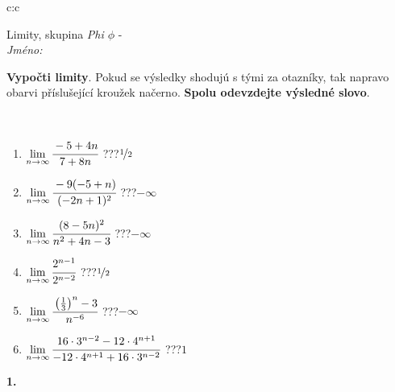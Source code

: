 \documentclass[10pt]{report}
\begin{document}
\begin{tabular}{c:c}
\begin{minipage}[c][104.5mm][t]{0.5\linewidth}
\begin{center}
\vspace{7mm}
{\huge Limity, skupina \textit{Phi $\phi$} -}\\[5mm]
\textit{Jméno:}\phantom{xxxxxxxxxxxxxxxxxxxxxxxxxxxxxxxxxxxxxxxxxxxxxxxxxxxxxxxxxxxxxxxxx}\\[5mm]
\begin{minipage}{0.95\linewidth}
\begin{center}
\textbf{Vypočti limity}. Pokud se výsledky shodujú s tými za otazníky, tak napravo\\obarvi příslušející kroužek načerno. \textbf{Spolu odevzdejte výsledné slovo}.
\end{center}
\end{minipage}
\\[1mm]
\begin{minipage}{0.79\linewidth}
\begin{center}
\begin{varwidth}{\linewidth}
\begin{enumerate}
\normalsize
\item $\lim\limits_{n\to\infty}\cfrac{-5+4n}{7+8n}$\quad \dotfill\; ???\;\dotfill \quad $\nicefrac{1}{2}$
\item $\lim\limits_{n\to\infty}\cfrac{-9(-5+n)}{(-2n+1)^2}$\quad \dotfill\; ???\;\dotfill \quad $-\infty$
\item $\lim\limits_{n\to\infty}\cfrac{(8-5n)^2}{n^2+4n-3}$\quad \dotfill\; ???\;\dotfill \quad $-\infty$
\item $\lim\limits_{n\to\infty}\cfrac{2^{n-1}}{2^{n-2}}$\quad \dotfill\; ???\;\dotfill \quad $\nicefrac{1}{2}$
\item $\lim\limits_{n\to\infty}\cfrac{\left(\frac{1}{3}\right)^n -3}{n^{-6}}$\quad \dotfill\; ???\;\dotfill \quad $-\infty$
\item $\lim\limits_{n\to\infty}\cfrac{16\cdot 3^{n-2}-12\cdot 4^{n+1}}{-12\cdot 4^{n+1}+16\cdot 3^{n-2}}$\quad \dotfill\; ???\;\dotfill \quad $1$
\end{enumerate}
\end{varwidth}
\end{center}
\end{minipage}
\begin{minipage}{0.20\linewidth}
\begin{center}
{\Huge\bfseries 1.} \\[2mm]

\end{center}
\end{minipage}
\end{center}
\end{minipage}
\end{tabular}
\end{document}
